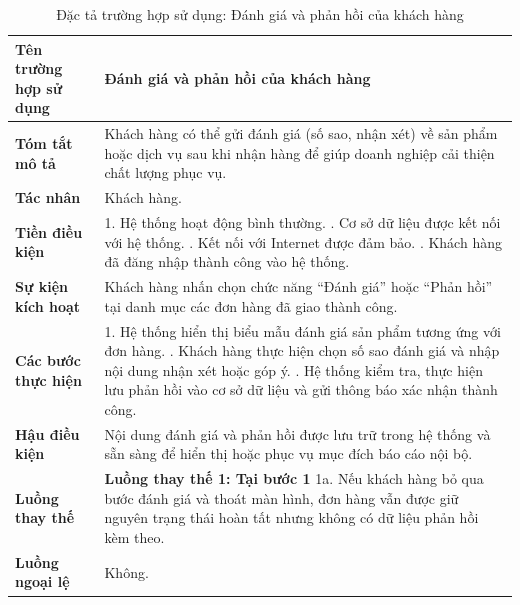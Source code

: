 {
\begin{longtable}{|>{\bfseries}p{4cm}|p{11.5cm}|}
\caption{Đặc tả trường hợp sử dụng: Đánh giá và phản hồi của khách hàng}
\label{tab:uc-customer-review} \\
\hline
\textbf{Tên trường hợp sử dụng} & Đánh giá và phản hồi của khách hàng \\
\hline
\textbf{Tóm tắt mô tả} & Khách hàng có thể gửi đánh giá (số sao, nhận xét) về sản phẩm hoặc dịch vụ sau khi nhận hàng để giúp doanh nghiệp cải thiện chất lượng phục vụ. \\
\hline
\textbf{Tác nhân} & Khách hàng. \\
\hline
\textbf{Tiền điều kiện} & 1. Hệ thống hoạt động bình thường. \newline
2. Cơ sở dữ liệu được kết nối với hệ thống. \newline
3. Kết nối với Internet được đảm bảo. \newline
4. Khách hàng đã đăng nhập thành công vào hệ thống. \\
\hline
\textbf{Sự kiện kích hoạt} & Khách hàng nhấn chọn chức năng “Đánh giá” hoặc “Phản hồi” tại danh mục các đơn hàng đã giao thành công. \\
\hline
\textbf{Các bước thực hiện} & 1. Hệ thống hiển thị biểu mẫu đánh giá sản phẩm tương ứng với đơn hàng. \newline
2. Khách hàng thực hiện chọn số sao đánh giá và nhập nội dung nhận xét hoặc góp ý. \newline
3. Hệ thống kiểm tra, thực hiện lưu phản hồi vào cơ sở dữ liệu và gửi thông báo xác nhận thành công. \\
\hline
\textbf{Hậu điều kiện} & Nội dung đánh giá và phản hồi được lưu trữ trong hệ thống và sẵn sàng để hiển thị hoặc phục vụ mục đích báo cáo nội bộ. \\
\hline
\textbf{Luồng thay thế} & \textbf{Luồng thay thế 1: Tại bước 1} \newline
1a. Nếu khách hàng bỏ qua bước đánh giá và thoát màn hình, đơn hàng vẫn được giữ nguyên trạng thái hoàn tất nhưng không có dữ liệu phản hồi kèm theo. \\
\hline
\textbf{Luồng ngoại lệ} & Không. \\
\hline
\end{longtable}

}
